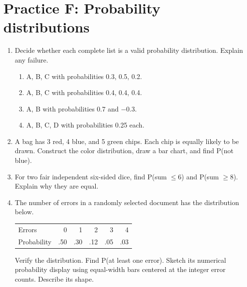 \section*{Practice F: Probability distributions}
\begin{enumerate}[label=F\arabic*.,leftmargin=2.5em,itemsep=10pt]
\item Decide whether each complete list is a valid probability distribution. Explain any failure.
\begin{enumerate}[label=(\alph*)]
\item A, B, C with probabilities 0.3, 0.5, 0.2.
\item A, B, C with probabilities 0.4, 0.4, 0.4.
\item A, B with probabilities 0.7 and $-0.3$.
\item A, B, C, D with probabilities 0.25 each.
\end{enumerate}
\item A bag has 3 red, 4 blue, and 5 green chips. Each chip is equally likely to be drawn. Construct the color distribution, draw a bar chart, and find P(not blue).
\item For two fair independent six-sided dice, find P(sum $\leq6$) and P(sum $\geq8$). Explain why they are equal.
\item The number of errors in a randomly selected document has the distribution below.
\begin{center}\begin{tabular}{lrrrrr}\toprule
Errors & 0 & 1 & 2 & 3 & 4\\
Probability & .50 & .30 & .12 & .05 & .03\\\bottomrule
\end{tabular}\end{center}
Verify the distribution. Find P(at least one error). Sketch its numerical probability display using equal-width bars centered at the integer error counts. Describe its shape.
\end{enumerate}


